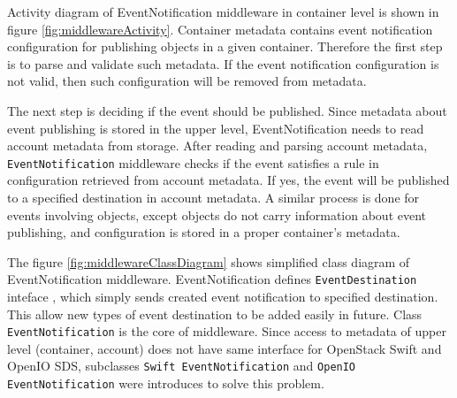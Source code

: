     Activity diagram of EventNotification middleware in container level is shown in figure \ref{fig:middlewareActivity}. Container metadata contains event notification configuration for publishing objects in a given container. Therefore the first step is to parse and validate such metadata. If the event notification configuration is not valid, then such configuration will be removed from metadata.

    The next step is deciding if the event should be published. Since metadata about event publishing is stored in the upper level, EventNotification needs to read account metadata from storage. After reading and parsing account metadata, \texttt{EventNotification} middleware checks if the event satisfies a rule in configuration retrieved from account metadata. If yes, the event will be published to a specified destination in account metadata. A similar process is done for events involving objects, except objects do not carry information about event publishing, and configuration is stored in a proper container's metadata.

    The figure \ref{fig:middlewareClassDiagram} shows simplified class diagram of EventNotification middleware. EventNotification defines \texttt{EventDestination} inteface , which simply sends created event notification to specified destination. This allow new types of event destination to be added easily in future. Class \texttt{EventNotification} is the core of middleware. Since access to metadata of upper level (container, account) does not have same interface for OpenStack Swift and OpenIO SDS, subclasses \texttt{Swift EventNotification} and \texttt{OpenIO EventNotification} were introduces to solve this problem.

